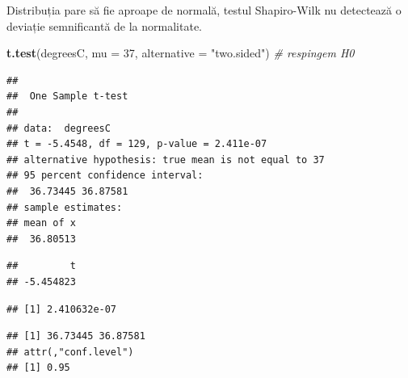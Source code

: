 \documentclass[]{article}
\newenvironment{Shaded}{\begin{snugshade}}{\end{snugshade}}
\newcommand{\KeywordTok}[1]{\textcolor[rgb]{0.13,0.29,0.53}{\textbf{{#1}}}}
\newcommand{\DataTypeTok}[1]{\textcolor[rgb]{0.13,0.29,0.53}{{#1}}}
\newcommand{\DecValTok}[1]{\textcolor[rgb]{0.00,0.00,0.81}{{#1}}}
\newcommand{\StringTok}[1]{\textcolor[rgb]{0.31,0.60,0.02}{{#1}}}
\newcommand{\CommentTok}[1]{\textcolor[rgb]{0.56,0.35,0.01}{\textit{{#1}}}}
\newcommand{\NormalTok}[1]{{#1}}
\begin{document}
Distribuția pare să fie aproape de normală, testul Shapiro-Wilk nu
detectează o deviație semnificantă de la normalitate.

\begin{Shaded}
\begin{Highlighting}[]
\KeywordTok{t.test}\NormalTok{(degreesC, }\DataTypeTok{mu =} \DecValTok{37}\NormalTok{, }\DataTypeTok{alternative =} \StringTok{"two.sided"}\NormalTok{) }\CommentTok{# respingem H0}
\end{Highlighting}
\end{Shaded}

\begin{verbatim}
## 
##  One Sample t-test
## 
## data:  degreesC
## t = -5.4548, df = 129, p-value = 2.411e-07
## alternative hypothesis: true mean is not equal to 37
## 95 percent confidence interval:
##  36.73445 36.87581
## sample estimates:
## mean of x 
##  36.80513
\end{verbatim}

\begin{Shaded}
\end{Shaded}

\begin{verbatim}
##         t 
## -5.454823
\end{verbatim}

\begin{Shaded}
\end{Shaded}

\begin{verbatim}
## [1] 2.410632e-07
\end{verbatim}

\begin{Shaded}
\end{Shaded}

\begin{verbatim}
## [1] 36.73445 36.87581
## attr(,"conf.level")
## [1] 0.95
\end{verbatim}
\end{document}
